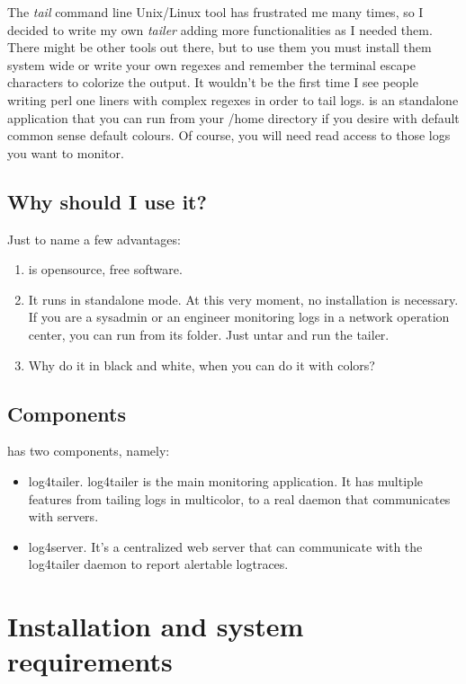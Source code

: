 The \emph{tail} command line Unix/Linux tool has frustrated me many times, so I
decided to write my own \emph{tailer} adding more functionalities as I needed
them. There might be other tools out there, but to use them you must install
them system wide or write your own regexes and remember the terminal escape
characters to colorize the output. It wouldn't be the first time I see people
writing perl one liners with complex regexes in order to tail logs. \logftailer{}
is an standalone application that you can run from your /home directory if you
desire with default common sense default colours.  Of course, you will need
read access to those logs you want to monitor. 

\subsection{Why should I use it?}
Just to name a few advantages:

\begin{enumerate}
    \item \logftailer{} is opensource, free software.
    \item It runs in standalone mode.
At this very moment, no installation is necessary.  If you are a sysadmin or an
engineer monitoring logs in a network operation center, you can run
\logftailer{} from its folder. Just untar and run the tailer. 
    \item Why do it in black and white, when you can do it with colors?
\end{enumerate}

\subsection{Components}
\logftailer{} has two components, namely:
\begin{itemize}
    \item log4tailer. log4tailer is the main monitoring application. It has
multiple features from tailing logs in multicolor, to a real daemon that
communicates with servers.
    \item log4server. It's a centralized web server that can communicate with
the log4tailer daemon to report alertable logtraces. 
\end{itemize}


\section{Installation and system requirements}


